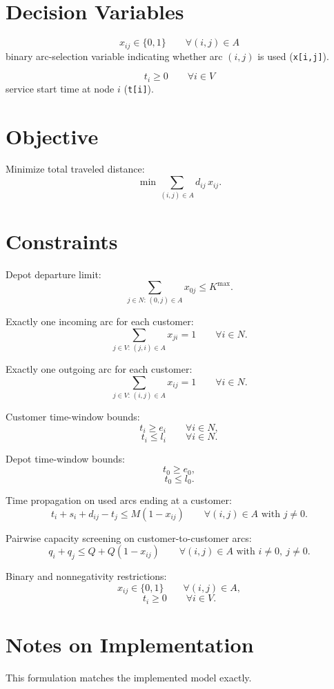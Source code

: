 \section*{Decision Variables}

\[
x_{ij} \in \{0,1\} \qquad \forall (i,j)\in A
\]
binary arc-selection variable indicating whether arc \((i,j)\) is used (\texttt{x[i,j]}).

\[
t_i \ge 0 \qquad \forall i\in V
\]
service start time at node \(i\) (\texttt{t[i]}).

\section*{Objective}

Minimize total traveled distance:
\[
\min \sum_{(i,j)\in A} d_{ij}\,x_{ij}.
\]

\section*{Constraints}

Depot departure limit:
\[
\sum_{j\in N:\,(0,j)\in A} x_{0j} \le K^{\max}.
\]

Exactly one incoming arc for each customer:
\[
\sum_{j\in V:\,(j,i)\in A} x_{ji}=1
\qquad \forall i\in N.
\]

Exactly one outgoing arc for each customer:
\[
\sum_{j\in V:\,(i,j)\in A} x_{ij}=1
\qquad \forall i\in N.
\]

Customer time-window bounds:
\[
t_i \ge e_i \qquad \forall i\in N,
\]
\[
t_i \le l_i \qquad \forall i\in N.
\]

Depot time-window bounds:
\[
t_0 \ge e_0,
\]
\[
t_0 \le l_0.
\]

Time propagation on used arcs ending at a customer:
\[
t_i + s_i + d_{ij} - t_j \le M(1-x_{ij})
\qquad \forall (i,j)\in A \text{ with } j\neq 0.
\]

Pairwise capacity screening on customer-to-customer arcs:
\[
q_i+q_j \le Q + Q(1-x_{ij})
\qquad \forall (i,j)\in A \text{ with } i\neq 0,\ j\neq 0.
\]

Binary and nonnegativity restrictions:
\[
x_{ij}\in\{0,1\} \qquad \forall (i,j)\in A,
\]
\[
t_i\ge 0 \qquad \forall i\in V.
\]

\section*{Notes on Implementation}

This formulation matches the implemented model exactly.

